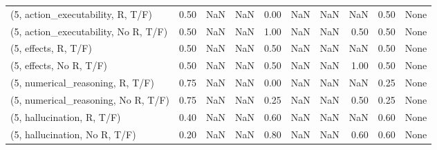 \begin{table*}[h!]
\begin{adjustbox}{width=2\columnwidth,center}
\begin{tabular}{lrrr|rrr|rrr}
(5, action\_executability, R, T/F)    &                      0.50 &                   NaN &                       NaN &                          0.00 &                       NaN &                           NaN &                                    NaN &                               0.50 &                                  None \\
(5, action\_executability, No R, T/F) &                      0.50 &                   NaN &                       NaN &                          1.00 &                       NaN &                           NaN &                                   0.50 &                               0.50 &                                  None \\
(5, effects, R, T/F)                 &                      0.50 &                   NaN &                       NaN &                          0.50 &                       NaN &                           NaN &                                    NaN &                               0.50 &                                  None \\
(5, effects, No R, T/F)              &                      0.50 &                   NaN &                       NaN &                          0.50 &                       NaN &                           NaN &                                   1.00 &                               0.50 &                                  None \\
(5, numerical\_reasoning, R, T/F)     &                      0.75 &                   NaN &                       NaN &                          0.00 &                       NaN &                           NaN &                                    NaN &                               0.25 &                                  None \\
(5, numerical\_reasoning, No R, T/F)  &                      0.75 &                   NaN &                       NaN &                          0.25 &                       NaN &                           NaN &                                   0.50 &                               0.25 &                                  None \\
(5, hallucination, R, T/F)           &                      0.40 &                   NaN &                       NaN &                          0.60 &                       NaN &                           NaN &                                    NaN &                               0.60 &                                  None \\
(5, hallucination, No R, T/F)        &                      0.20 &                   NaN &                       NaN &                          0.80 &                       NaN &                           NaN &                                   0.60 &                               0.60 &                                  None \\

\end{tabular}
\end{adjustbox}
\end{table*}

